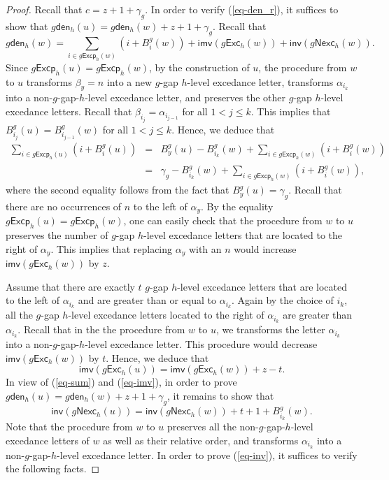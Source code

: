 \documentclass[10pt,a4paper]{amsart}
\def\Exc{\mathsf{Exc}}
\def\Excp{\mathsf{Excp}}
\def\Nexc{\mathsf{Nexc}}
\def\den{\mathsf{den}}
\def\imv{\mathsf{imv}}
\def\inv{\mathsf{inv}}
\begin{document}
\begin{proof}
Recall that $c=z+1+\gamma_g$. 
  In order to verify (\ref{eq-den_r}), it suffices to show that $g\den_h(u)=g\den_h(w)+z+1+\gamma_g$. 
Recall that 
$$
g\den_h(w)=\sum\limits_{i\in g\Excp_h(w)}(i+B^g_i(w)) +{\imv}(g\Exc_h(w))+{\inv}(g\Nexc_h (w)).
$$
Since $g\Excp_h(u)=g\Excp_h(w)$,  by the construction of $u$, the procedure from $w$ to $u$ transforms $\beta_{y}=n$ into a new $g$-gap $h$-level excedance letter, transforms $\alpha_{i_k}$ into a non-$g$-gap-$h$-level excedance letter, and preserves the other $g$-gap $h$-level excedance letters. Recall that 
$\beta_{i_j}=\alpha_{i_{j-1}}$ for all $1<j\leq k$. This implies that $B^g_{i_j}(u)=B^g_{i_{j-1}}(w)$ for all $1<j\leq k$. 
 Hence, we deduce that 
\begin{equation}\label{eq-sum}
	\begin{array}{lll}
\sum\limits_{i\in g\Excp_h(u)} (i+B^g_i(u))&=&B^g_{y}(u)-B^g_{i_k}(w)+\sum\limits_{i\in g\Excp_h(w)} (i+B^g_i(w))\\
&=&\gamma_g-B^g_{i_k}(w)+\sum\limits_{i\in g\Excp_h(w)} (i+B^g_i(w)),
\end{array}
\end{equation} 
  where  the second equality follows from the fact that  $B^g_y(u)=\gamma_g$.  
  Recall that there are no occurrences of $n$ to the left of $\alpha_y$. 
By the  equality $g\Excp_h(u)=g\Excp_h(w)$,  one can easily check that the procedure from $w$ to $u$ preserves the number of $g$-gap $h$-level excedance letters that are located to the right of $\alpha_y$. This implies that replacing $\alpha_{y}$ with  an $n$ would increase  ${\imv}(g\Exc_h(w))$ by $z$. 

Assume that there are exactly $t$ $g$-gap $h$-level excedance letters that are located to the left of $\alpha_{i_{k}}$ and  are greater than or equal to $\alpha_{i_k}$. Again by the choice  of $i_k$, all the $g$-gap $h$-level excedance letters located to the right of $\alpha_{i_k}$ are greater  than $\alpha_{i_k}$.  Recall that in the  the procedure from $w$ to $u$, we  transforms the letter  $\alpha_{i_k}$ into a non-$g$-gap-$h$-level excedance letter.    This procedure would decrease ${\imv}(g\Exc_h(w))$ by $t$.   Hence, we deduce that \begin{equation}\label{eq-imv}
	{\imv}(g\Exc_h(u))={\imv}(g\Exc_h(w))+z-t.
\end{equation}
In view of  (\ref{eq-sum}) and (\ref{eq-imv}), in order to prove $g\den_h(u)=g\den_h(w)+z+1+\gamma_g$, it remains to show that 
\begin{equation}\label{eq-inv}
	{\inv}(g\Nexc_h(u))={\inv}(g\Nexc_h(w))+t+1+B^g_{i_k}(w).
\end{equation} 
 Note that the procedure from $w$ to $u$  preserves    all the non-$g$-gap-$h$-level excedance letters of $w$ as well as their relative order,  and transforms  $\alpha_{i_k}$ into a non-$g$-gap-$h$-level excedance letter.  In order to prove (\ref{eq-inv}),  it suffices to  verify the following facts.


\end{proof}
\end{document}
